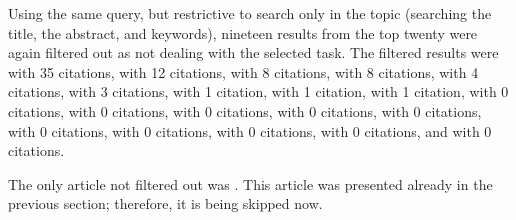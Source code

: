Using the same query, but restrictive to search only in the topic (searching the title, the abstract, and keywords), nineteen results from the top twenty were again filtered out as not dealing with the selected task. The filtered results were \cite{crystal-structure-cnn} with 35 citations, \cite{cnn-neuroimaging} with 12 citations, \cite{real-time-management} with 8 citations, \cite{dl-age-estimation} with 8 citations, \cite{animal-species-cnn} with 4 citations, \cite{ground-measurement-forest} with 3 citations, \cite{w-net-lc} with 1 citation, \cite{ai-infection-biology} with 1 citation, \cite{dl-brain-stimulation} with 1 citation, \cite{language-network-dl} with 0 citations, \cite{reproductive-structures-herbarium} with 0 citations, \cite{limb-rehabilitation} with 0 citations, \cite{review-crowd-monitoring} with 0 citations, \cite{optical-coherence-tomography} with 0 citations, \cite{autism-disorder-corrigendum} with 0 citations, \cite{smartphone-photorefraction} with 0 citations, \cite{dl-galapagos-snake} with 0 citations, \cite{autism-disorder} with 0 citations, and \cite{acoustic-scene} with 0 citations.

The only article not filtered out was \cite{urban-green-unsupervised-aerial}. This article was presented already in the previous section; therefore, it is being skipped now.